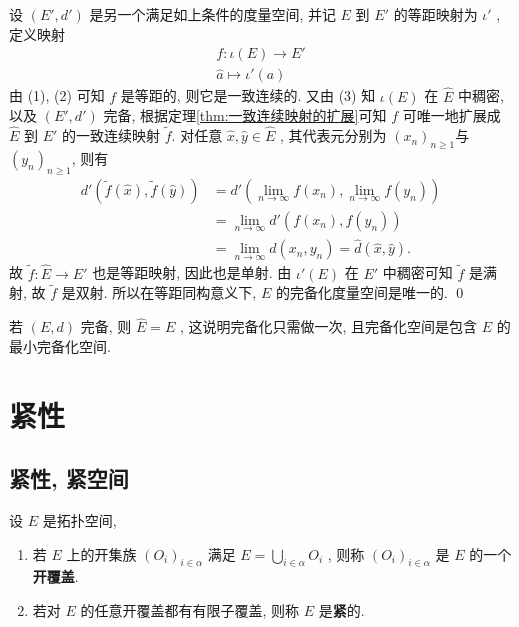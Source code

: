 \begin{Proof}
          设 $ (E', d') $ 是另一个满足如上条件的度量空间, 并记 $ E $ 到 $ E' $ 的等距映射为 $ \iota' $ , 定义映射
          \[
               \begin{aligned}
                    f: \iota(E)  \to E'\\
                    \hat{a} \mapsto \iota'(a)
               \end{aligned}
          \]
          由 (1), (2) 可知 $ f $ 是等距的, 则它是一致连续的. 又由 (3) 知 $ \iota(E) $ 在 $ \widehat{E} $ 中稠密, 以及 $ (E', d') $ 完备, 根据定理\ref{thm:一致连续映射的扩展}可知 $ f $ 可唯一地扩展成 $ \widehat{E} $ 到 $ E' $ 的一致连续映射 $ \tilde{f} $. 对任意 $ \hat{x}, \hat{y}\in \widehat{E} $ , 其代表元分别为 $ (x_{n})_{n\geqslant1} $与 $ (y_{n})_{n\geqslant1} $, 则有
          \[
               \begin{aligned}
                    d'(\tilde{f}(\hat{x}), \tilde{f}(\hat{y})) & = d'(\lim_{n\to\infty}f(x_{n}), \lim_{n\to\infty}f(y_{n}))\\
                    & = \lim_{n\to\infty} d'(f(x_{n}), f(y_{n}))\\
                    & = \lim_{n\to\infty} d(x_{n}, y_{n})=\hat{d}(\hat{x}, \hat{y}).
               \end{aligned}
          \]
          故 $ \tilde{f}:\widehat{E}\to E' $ 也是等距映射, 因此也是单射. 由 $ \iota'(E) $ 在 $ E' $ 中稠密可知 $ \tilde{f} $ 是满射, 故 $ \tilde{f} $ 是双射. 所以在等距同构意义下, $ E $ 的完备化度量空间是唯一的. \qed
     \end{Proof}

     \begin{Remark}
          若 $ (E, d) $ 完备, 则 $ \widehat{E}=E $ , 这说明完备化只需做一次, 且完备化空间是包含 $ E $ 的最小完备化空间.
     \end{Remark}

\section{紧性}
     \subsection{紧性, 紧空间}
     \begin{Definition}[紧性]\label{def:紧性}
           设 $ E $ 是拓扑空间,
           \begin{enumerate}[(1)]
                \item 若 $ E $ 上的开集族 $ (O_{i})_{i\in \alpha} $ 满足 $ E=\bigcup_{i\in\alpha}O_{i} $ , 则称 $ (O_{i})_{i\in\alpha} $ 是 $ E $ 的一个\textbf{开覆盖}.
                \item 若对 $ E $ 的任意开覆盖都有有限子覆盖, 则称 $ E $ 是\textbf{紧}的.
           \end{enumerate}
     \end{Definition}

